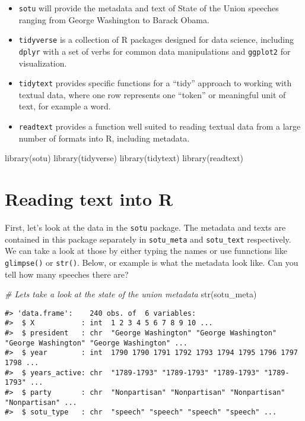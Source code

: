 \documentclass[
]{book}
\newenvironment{Shaded}{\begin{snugshade}}{\end{snugshade}}
\newcommand{\CommentTok}[1]{\textcolor[rgb]{0.56,0.35,0.01}{\textit{#1}}}
\newcommand{\FunctionTok}[1]{\textcolor[rgb]{0.00,0.00,0.00}{#1}}
\newcommand{\NormalTok}[1]{#1}
\providecommand{\tightlist}{%
  \setlength{\itemsep}{0pt}\setlength{\parskip}{0pt}}
\begin{document}
\begin{itemize}
\tightlist
\item
  \texttt{sotu} will provide the metadata and text of State of the Union speeches ranging from George Washington to Barack Obama.
\item
  \texttt{tidyverse} is a collection of R packages designed for data science, including \texttt{dplyr} with a set of verbs for common data manipulations and \texttt{ggplot2} for visualization.
\item
  \texttt{tidytext} provides specific functions for a ``tidy'' approach to working with textual data, where one row represents one ``token'' or meaningful unit of text, for example a word.
\item
  \texttt{readtext} provides a function well suited to reading textual data from a large number of formats into R, including metadata.
\end{itemize}

\begin{Shaded}
\begin{Highlighting}[]
\FunctionTok{library}\NormalTok{(sotu)}
\FunctionTok{library}\NormalTok{(tidyverse)}
\FunctionTok{library}\NormalTok{(tidytext)}
\FunctionTok{library}\NormalTok{(readtext)}
\end{Highlighting}
\end{Shaded}

\hypertarget{reading-text-into-r}{%
\section{Reading text into R}\label{reading-text-into-r}}

First, let's look at the data in the \texttt{sotu} package. The metadata and texts are contained in this package separately in \texttt{sotu\_meta} and \texttt{sotu\_text} respectively. We can take a look at those by either typing the names or use funnctions like \texttt{glimpse()} or \texttt{str()}. Below, or example is what the metadata look like. Can you tell how many speeches there are?

\begin{Shaded}
\begin{Highlighting}[]
\CommentTok{\# Let\textquotesingle{}s take a look at the state of the union metadata}
\FunctionTok{str}\NormalTok{(sotu\_meta)}
\end{Highlighting}
\end{Shaded}

\begin{verbatim}
#> 'data.frame':    240 obs. of  6 variables:
#>  $ X           : int  1 2 3 4 5 6 7 8 9 10 ...
#>  $ president   : chr  "George Washington" "George Washington" "George Washington" "George Washington" ...
#>  $ year        : int  1790 1790 1791 1792 1793 1794 1795 1796 1797 1798 ...
#>  $ years_active: chr  "1789-1793" "1789-1793" "1789-1793" "1789-1793" ...
#>  $ party       : chr  "Nonpartisan" "Nonpartisan" "Nonpartisan" "Nonpartisan" ...
#>  $ sotu_type   : chr  "speech" "speech" "speech" "speech" ...
\end{verbatim}
\end{document}
